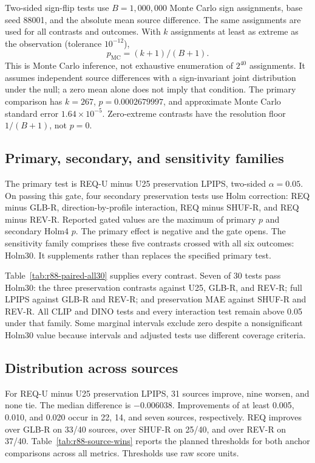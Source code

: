 \documentclass[10pt,doubleanonymous]{ieeeconf}
\begin{document}
Two-sided sign-flip tests use $B=1,000,000$ Monte Carlo sign assignments, base seed 88001, and the absolute mean source difference. The same assignments are used for all contrasts and outcomes. With $k$ assignments at least as extreme as the observation (tolerance $10^{-12}$),
\begin{equation}
p_{\mathrm{MC}}=(k+1)/(B+1).
\end{equation}
This is Monte Carlo inference, not exhaustive enumeration of $2^{40}$ assignments. It assumes independent source differences with a sign-invariant joint distribution under the null; a zero mean alone does not imply that condition. The primary comparison has $k=267$, $p=0.0002679997$, and approximate Monte Carlo standard error $1.64\times10^{-5}$. Zero-extreme contrasts have the resolution floor $1/(B+1)$, not $p=0$.

\subsection{Primary, secondary, and sensitivity families}
The primary test is REQ-U minus U25 preservation LPIPS, two-sided $\alpha=0.05$. On passing this gate, four secondary preservation tests use Holm correction: REQ minus GLB-R, direction-by-profile interaction, REQ minus SHUF-R, and REQ minus REV-R. Reported gated values are the maximum of primary $p$ and secondary Holm4 $p$. The primary effect is negative and the gate opens. The sensitivity family comprises these five contrasts crossed with all six outcomes: Holm30. It supplements rather than replaces the specified primary test.

Table~\ref{tab:r88-paired-all30} supplies every contrast. Seven of 30 tests pass Holm30: the three preservation contrasts against U25, GLB-R, and REV-R; full LPIPS against GLB-R and REV-R; and preservation MAE against SHUF-R and REV-R. All CLIP and DINO tests and every interaction test remain above 0.05 under that family. Some marginal intervals exclude zero despite a nonsignificant Holm30 value because intervals and adjusted tests use different coverage criteria.



\subsection{Distribution across sources}
For REQ-U minus U25 preservation LPIPS, 31 sources improve, nine worsen, and none tie. The median difference is $-0.006038$. Improvements of at least 0.005, 0.010, and 0.020 occur in 22, 14, and seven sources, respectively. REQ improves over GLB-R on 33/40 sources, over SHUF-R on 25/40, and over REV-R on 37/40. Table~\ref{tab:r88-source-wins} reports the planned thresholds for both anchor comparisons across all metrics. Thresholds use raw score units.
\end{document}
